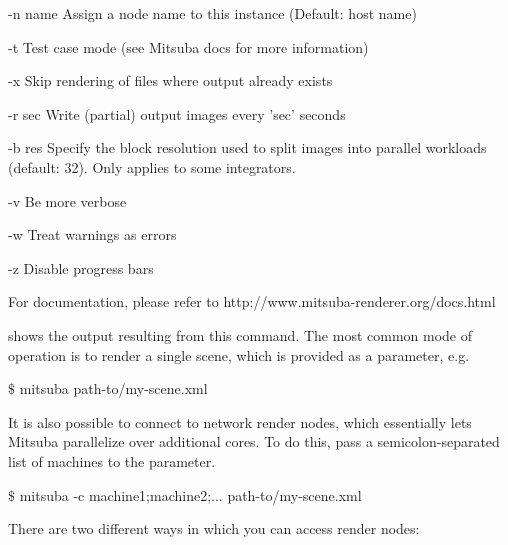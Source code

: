 \begin{console}[label=lst:mitsuba-cli,caption=Command line options of the \texttt{mitsuba} binary]
   -n name     Assign a node name to this instance (Default: host name)

   -t          Test case mode (see Mitsuba docs for more information)

   -x          Skip rendering of files where output already exists

   -r sec      Write (partial) output images every 'sec' seconds

   -b res      Specify the block resolution used to split images into parallel
               workloads (default: 32). Only applies to some integrators.

   -v          Be more verbose

   -w          Treat warnings as errors

   -z          Disable progress bars

 For documentation, please refer to http://www.mitsuba-renderer.org/docs.html
\end{console}
 shows the output resulting from this command. The most common
mode of operation is to render a single scene, which is provided as a parameter, e.g.
\begin{shell}
$\texttt{\$}$ mitsuba path-to/my-scene.xml
\end{shell}
It is also possible to connect to network render nodes, which essentially lets Mitsuba parallelize
over additional cores. To do this, pass a semicolon-separated list of machines to
the  parameter.
\begin{shell}
$\texttt{\$}$ mitsuba -c machine1;machine2;... path-to/my-scene.xml
\end{shell}
There are two different ways in which you can access render nodes:
